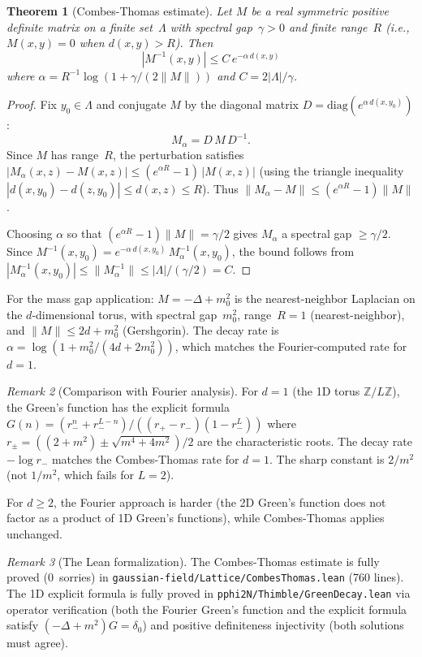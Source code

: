 \documentclass[12pt]{article}
\newtheorem{theorem}{Theorem}
\theoremstyle{definition}
\theoremstyle{remark}
\newtheorem{remark}[theorem]{Remark}
\newcommand{\Z}{\mathbb{Z}}
\newcommand{\La}{\Lambda}
\begin{document}
\begin{theorem}[Combes-Thomas estimate]\label{thm:combes_thomas}
Let $M$ be a real symmetric positive definite matrix on a finite
set~$\La$ with spectral gap~$\gamma > 0$ and finite range~$R$
(i.e., $M(x,y) = 0$ when $d(x,y) > R$). Then
\begin{equation}
  |M^{-1}(x,y)| \le C\,e^{-\alpha\,d(x,y)}
\end{equation}
where $\alpha = R^{-1}\log(1 + \gamma/(2\|M\|))$ and
$C = 2|\La|/\gamma$.
\end{theorem}

\begin{proof}
Fix $y_0 \in \La$ and conjugate $M$ by the diagonal matrix
$D = \mathrm{diag}(e^{\alpha\,d(x,y_0)})$:
\[
  M_\alpha = D\,M\,D^{-1}.
\]
Since $M$ has range~$R$, the perturbation satisfies
$|M_\alpha(x,z) - M(x,z)| \le (e^{\alpha R}-1)\,|M(x,z)|$
(using the triangle inequality $|d(x,y_0)-d(z,y_0)| \le d(x,z) \le R$).
Thus $\|M_\alpha - M\| \le (e^{\alpha R}-1)\|M\|$.

Choosing $\alpha$ so that $(e^{\alpha R}-1)\|M\| = \gamma/2$ gives
$M_\alpha$ a spectral gap $\ge \gamma/2$. Since
$M^{-1}(x,y_0) = e^{-\alpha\,d(x,y_0)}\,M_\alpha^{-1}(x,y_0)$,
the bound follows from $|M_\alpha^{-1}(x,y_0)| \le \|M_\alpha^{-1}\|
\le |\La|/(\gamma/2) = C$.
\end{proof}

For the mass gap application: $M = -\Delta + m_0^2$ is the
nearest-neighbor Laplacian on the $d$-dimensional torus, with
spectral gap~$m_0^2$, range~$R = 1$ (nearest-neighbor), and
$\|M\| \le 2d + m_0^2$ (Gershgorin). The decay rate is
$\alpha = \log(1 + m_0^2/(4d + 2m_0^2))$, which matches
the Fourier-computed rate for $d = 1$.

\begin{remark}[Comparison with Fourier analysis]
For $d=1$ (the 1D torus $\Z/L\Z$), the Green's function has
the explicit formula
$G(n) = (r_-^n + r_-^{L-n})/((r_+ - r_-)(1 - r_-^L))$
where $r_\pm = ((2+m^2) \pm \sqrt{m^4+4m^2})/2$ are the
characteristic roots. The decay rate $-\log r_-$ matches the
Combes-Thomas rate for $d=1$. The sharp constant is $2/m^2$
(not $1/m^2$, which fails for $L=2$).

For $d \ge 2$, the Fourier approach is harder (the 2D Green's
function does not factor as a product of 1D Green's functions),
while Combes-Thomas applies unchanged.
\end{remark}

\begin{remark}[The Lean formalization]
The Combes-Thomas estimate is fully proved (0~sorries) in
\texttt{gaussian-field/Lattice/CombesThomas.lean} (760 lines).
The 1D explicit formula is fully proved in
\texttt{pphi2N/Thimble/GreenDecay.lean} via operator verification
(both the Fourier Green's function and the explicit formula satisfy
$(-\Delta+m^2)G = \delta_0$) and positive definiteness injectivity
(both solutions must agree).
\end{remark}
\end{document}
